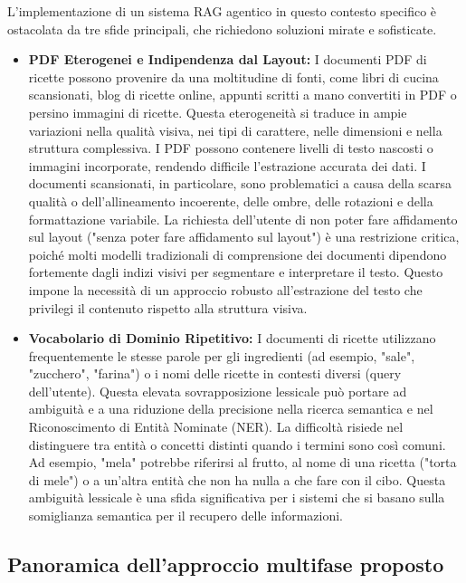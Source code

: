\documentclass[a4paper, 11pt]{article}
\begin{document}
L'implementazione di un sistema RAG agentico in questo contesto specifico è ostacolata da tre sfide principali, che richiedono soluzioni mirate e sofisticate.
\begin{itemize}
    \item \textbf{PDF Eterogenei e Indipendenza dal Layout:} I documenti PDF di ricette possono provenire da una moltitudine di fonti, come libri di cucina scansionati, blog di ricette online, appunti scritti a mano convertiti in PDF o persino immagini di ricette. Questa eterogeneità si traduce in ampie variazioni nella qualità visiva, nei tipi di carattere, nelle dimensioni e nella struttura complessiva. \cite{ocr_best_practices} I PDF possono contenere livelli di testo nascosti o immagini incorporate, rendendo difficile l'estrazione accurata dei dati. \cite{algodocs_challenges} I documenti scansionati, in particolare, sono problematici a causa della scarsa qualità o dell'allineamento incoerente, delle ombre, delle rotazioni e della formattazione variabile. \cite{algodocs_challenges} La richiesta dell'utente di non poter fare affidamento sul layout ("senza poter fare affidamento sul layout") è una restrizione critica, poiché molti modelli tradizionali di comprensione dei documenti dipendono fortemente dagli indizi visivi per segmentare e interpretare il testo. \cite{amazon_science_heterogenous} Questo impone la necessità di un approccio robusto all'estrazione del testo che privilegi il contenuto rispetto alla struttura visiva.
    \item \textbf{Vocabolario di Dominio Ripetitivo:} I documenti di ricette utilizzano frequentemente le stesse parole per gli ingredienti (ad esempio, "sale", "zucchero", "farina") o i nomi delle ricette in contesti diversi (query dell'utente). Questa elevata sovrapposizione lessicale può portare ad ambiguità e a una riduzione della precisione nella ricerca semantica e nel Riconoscimento di Entità Nominate (NER). La difficoltà risiede nel distinguere tra entità o concetti distinti quando i termini sono così comuni. Ad esempio, "mela" potrebbe riferirsi al frutto, al nome di una ricetta ("torta di mele") o a un'altra entità che non ha nulla a che fare con il cibo. Questa ambiguità lessicale è una sfida significativa per i sistemi che si basano sulla somiglianza semantica per il recupero delle informazioni. \cite{nlp_challenges}
\end{itemize}

\subsection{Panoramica dell'approccio multifase proposto}
\end{document}
